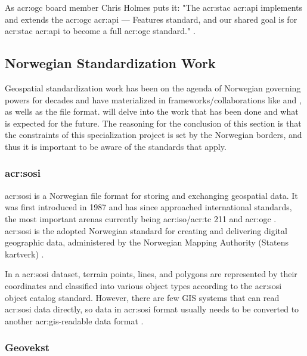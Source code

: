 As \acrshort{acr:ogc} board member Chris Holmes puts it: "The \acrshort{acr:stac} \acrshort{acr:api} implements and extends the \gls{acr:ogc} \acrshort{acr:api} — Features standard, and our shared goal is for \gls{acr:stac} \acrshort{acr:api} to become a full \gls{acr:ogc} standard." \citep{holmesSpatioTemporalAssetCatalogs2021}.

\subsection{Norwegian Standardization Work}\label{subsec:standardization-norway}

Geospatial standardization work has been on the agenda of Norwegian governing powers for decades and have materialized in frameworks/collaborations like  and , as wells as the  file format.  will delve into the work that has been done and what is expected for the future. The reasoning for the conclusion of this section is that the constraints of this specialization project is set by the Norwegian borders, and thus it is important to be aware of the standards that apply.

\subsubsection[SOSI]{\acrshort{acr:sosi}}\label{subsubsec:sosi}

\gls{acr:sosi} is a Norwegian file format for storing and exchanging geospatial data. It was first introduced in 1987 and has since approached international standards, the most important arenas currently being \acrshort{acr:iso}/\acrshort{acr:tc} 211 and \gls{acr:ogc} \citep{mardalNasjonalStrategiVidereutvikling2015}. \gls{acr:sosi} is the adopted Norwegian standard for creating and delivering digital geographic data, administered by the Norwegian Mapping Authority (Statens kartverk) \citep{maehlumSOSI2023}.

In a \gls{acr:sosi} dataset, terrain points, lines, and polygons are represented by their coordinates and classified into various object types according to the \gls{acr:sosi} object catalog standard. However, there are few GIS systems that can read \gls{acr:sosi} data directly, so data in \gls{acr:sosi} format usually needs to be converted to another \gls{acr:gis}-readable data format \citep{maehlumSOSI2023}.

\subsubsection{Geovekst}\label{subsubsec:geovekst}

